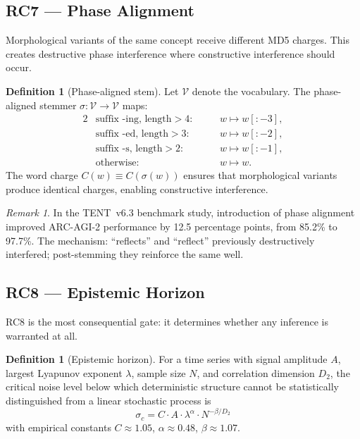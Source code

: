 \documentclass[12pt,a4paper]{article}
\theoremstyle{plain}
\theoremstyle{definition}
\newtheorem{definition}[theorem]{Definition}
\theoremstyle{remark}
\newtheorem{remark}[theorem]{Remark}
\begin{document}
\subsection{RC7 --- Phase Alignment}
\label{sec:rc7}

Morphological variants of the same concept receive different MD5 charges.
This creates destructive phase interference where constructive
interference should occur.

\begin{definition}[Phase-aligned stem]
Let $\mathcal{V}$ denote the vocabulary.  The phase-aligned stemmer
$\sigma:\mathcal{V}\to\mathcal{V}$ maps:
\begin{alignat}{2}
&\text{suffix -ing, length} > 4:&\quad& w \mapsto w[:-3], \\
&\text{suffix -ed,  length} > 3:&& w \mapsto w[:-2], \\
&\text{suffix -s,   length} > 2:&& w \mapsto w[:-1], \\
&\text{otherwise:}&& w \mapsto w.
\end{alignat}
The word charge $C(w) \equiv C(\sigma(w))$ ensures that morphological
variants produce identical charges, enabling constructive interference.
\end{definition}

\begin{remark}
In the TENT~v6.3 benchmark study, introduction of phase alignment
improved ARC-AGI-2 performance by 12.5 percentage points, from 85.2\%
to 97.7\%.  The mechanism: ``reflects'' and ``reflect'' previously
destructively interfered; post-stemming they reinforce the same well.
\end{remark}

\subsection{RC8 --- Epistemic Horizon}
\label{sec:rc8}

RC8 is the most consequential gate: it determines whether any inference
is warranted at all.

\begin{definition}[Epistemic horizon]
\label{def:rc8}
For a time series with signal amplitude $A$, largest Lyapunov exponent
$\lambda$, sample size $N$, and correlation dimension $D_2$, the
critical noise level below which deterministic structure cannot be
statistically distinguished from a linear stochastic process is
\begin{equation}
\boxed{
\sigma_c = C \cdot A \cdot \lambda^{\alpha} \cdot N^{-\beta/D_2}
}
\label{eq:rc8}
\end{equation}
with empirical constants $C \approx 1.05$, $\alpha \approx 0.48$,
$\beta \approx 1.07$.
\end{definition}
\end{document}
